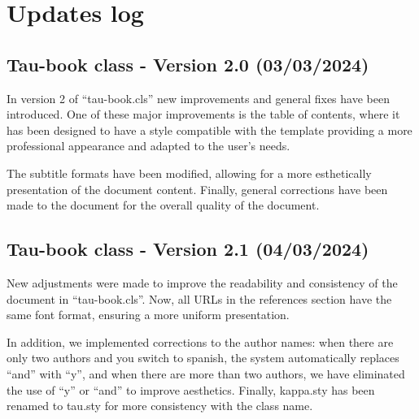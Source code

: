 \documentclass[10pt,a4paper,twoside]{tau-book}
\begin{document}
\section{Updates log}

    \subsection{Tau-book class - Version 2.0 (03/03/2024)}

        In version 2 of ``tau-book.cls'' new improvements and general fixes have been introduced. One of these major improvements is the table of contents, where it has been designed to have a style compatible with the template providing a more professional appearance and adapted to the user's needs. 

        The subtitle formats have been modified, allowing for a more esthetically presentation of the document content. Finally, general corrections have been made to the document for the overall quality of the document.

    \subsection{Tau-book class - Version 2.1 (04/03/2024)}

        New adjustments were made to improve the readability and consistency of the document in ``tau-book.cls''. Now, all URLs in the references section have the same font format, ensuring a more uniform presentation.

        In addition, we implemented corrections to the author names: when there are only two authors and you switch to spanish, the system automatically replaces ``and'' with ``y'', and when there are more than two authors, we have eliminated the use of ``y'' or ``and'' to improve aesthetics. Finally, kappa.sty has been renamed to tau.sty for more consistency with the class name. \cite{einstein}




\end{document}
